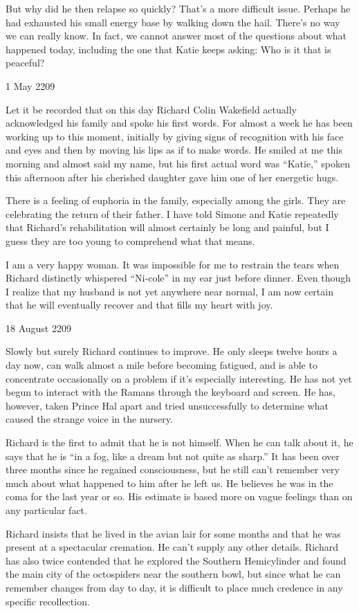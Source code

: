 \documentclass[]{article}
\begin{document}
{But why did he then relapse so quickly? That’s a more difficult issue. Perhaps he had exhausted his small energy base by walking down the hail. There’s no way we can really know. In fact, we cannot answer most of the questions about what happened today, including the one that Katie keeps asking: Who is it that is peaceful?

1 May 2209

Let it be recorded that on this day Richard Colin Wakefield actually acknowledged his family and spoke his first words. For almost a week he has been working up to this moment, initially by giving signs of recognition with his face and eyes and then by moving his lips as if to make words. He smiled at me this morning and almost said my name, but his first actual word was “Katie,” spoken this afternoon after his cherished daughter gave him one of her energetic hugs.

There is a feeling of euphoria in the family, especially among the girls. They are celebrating the return of their father. I have told Simone and Katie repeatedly that Richard’s rehabilitation will almost certainly be long and painful, but I guess they are too young to comprehend what that means.

I am a very happy woman. It was impossible for me to restrain the tears when Richard distinctly whispered “Ni-cole” in my ear just before dinner. Even though I realize that my husband is not yet anywhere near normal, I am now certain that he will eventually recover and that fills my heart with joy.

18 August 2209

Slowly but surely Richard continues to improve. He only sleeps twelve hours a day now, can walk almost a mile before becoming fatigued, and is able to concentrate occasionally on a problem if it’s especially interesting. He has not yet begun to interact with the Ramans through the keyboard and screen. He has, however, taken Prince Hal apart and tried unsuccessfully to determine what caused the strange voice in the nursery.

Richard is the first to admit that he is not himself. When he can talk about it, he says that he is “in a fog, like a dream but not quite as sharp.” It has been over three months since he regained consciousness, but he still can’t remember very much about what happened to him after he left us. He believes he was in the coma for the last year or so. His estimate is based more on vague feelings than on any particular fact.

Richard insists that he lived in the avian lair for some months and that he was present at a spectacular cremation. He can’t supply any other details. Richard has also twice contended that he explored the Southern Hemicylinder and found the main city of the octospiders near the southern bowl, but since what he can remember changes from day to day, it is difficult to place much credence in any specific recollection.

}
\end{document}
